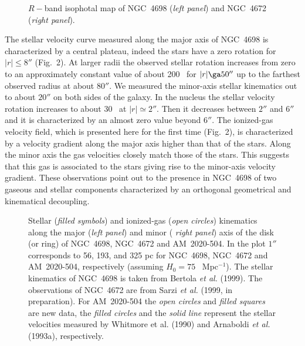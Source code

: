 \begin{figure}[ht] 
\vspace{7cm} 
\caption{$R-$band isophotal map of NGC~4698 ({\it left panel\/})
and NGC~4672 ({\it right panel\/}).}
\end{figure}


The stellar velocity curve measured along the major axis of NGC~4698 is
characterized by a central plateau, indeed the stars have a zero rotation for
$|r|\leq8''$ (Fig.~2).  At larger radii the observed stellar rotation
increases from zero to an approximately constant value of about 200 \kms\ for
$|r|\ga50''$ up to the farthest observed radius at about $80''$.  We measured
the minor-axis stellar kinematics out to about $20''$ on both sides of the
galaxy.  In the nucleus the stellar velocity rotation increases to about 30
\kms\ at $|r|\simeq2''$.  Then it decreases between $2''$ and $6''$ and it is
characterized by an almost zero value beyond $6''$.  The ionized-gas velocity
field, which is presented here for the first time (Fig.~2), is characterized
by a velocity gradient along the major axis higher than that of the stars.
Along the minor axis the gas velocities closely match those of the stars.
This suggests that this gas is associated to the stars giving rise to the
minor-axis velocity gradient.  These observations point out to the presence
in NGC~4698 of two gaseous and stellar components characterized by an
orthogonal geometrical and kinematical decoupling.



\begin{figure}[ht] 
\vspace{8cm} 
\caption{Stellar ({\it filled symbols\/}) and ionized-gas ({\it open
circles\/}) kinematics along the major ({\it left panel\/}) and minor ({\it
right panel\/}) axis of the disk (or ring) of NGC~4698, NGC~4672 and
AM~2020-504.  In the plot $1''$ corresponds to 56, 193, and 325 pc for
NGC~4698, NGC~4672 and AM~2020-504, respectively (assuming $H_0=75$ \kms\
Mpc$^{-1}$).  The stellar kinematics of NGC~4698 is taken from Bertola {\it
et al.\/} (1999).  The observations of NGC~4672 are from Sarzi {\it et al.\/}
(1999, in preparation).  For AM~2020-504 the {\it open circles} and {\it
filled squares} are new data, the {\it filled circles\/} and the {\it solid
line\/} represent the stellar velocities measured by Whitmore et al.  (1990)
and Arnaboldi {\it et al.\/} (1993a), respectively.}
\end{figure}



